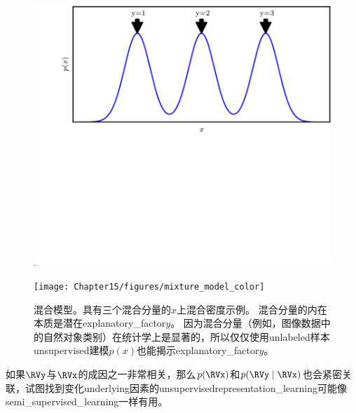 
\begin{figure}[!htb]
\ifOpenSource
\centerline{\includegraphics[scale=0.5]{images/131.png}}
\else
\centerline{\texttt{[image: Chapter15/figures/mixture\_model\_color]}}
\fi
\caption{混合模型。具有三个混合分量的$x$上混合密度示例。
混合分量的内在本质是潜在\gls{explanatory_factor}$y$。
因为混合分量（例如，图像数据中的自然对象类别）在统计学上是显著的，所以仅仅使用\gls{unlabeled}样本\gls{unsupervised}建模$p(x)$也能揭示\gls{explanatory_factor}$y$。
}
\label{fig:chap15_mixture_model}
\end{figure}



如果$\RVy$与$\RVx$的成因之一非常相关，那么$p(\RVx)$和$p(\RVy \mid \RVx)$也会紧密关联，试图找到变化\gls{underlying}因素的\gls{unsupervised}\gls{representation_learning}可能像\gls{semi_supervised_learning}一样有用。



